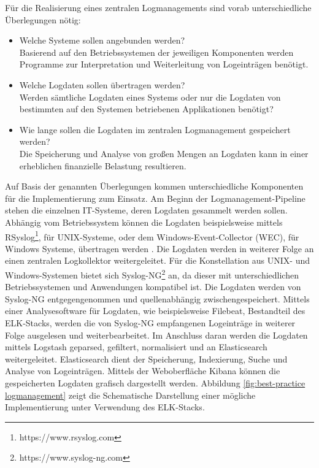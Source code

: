 Für die Realisierung eines zentralen Logmanagements sind vorab unterschiedliche Überlegungen nötig: 
\begin{itemize}
    \item Welche Systeme sollen angebunden werden?\\
    Basierend auf den Betriebssystemen der jeweiligen Komponenten werden Programme zur Interpretation und Weiterleitung von Logeinträgen benötigt. 
    \item Welche Logdaten sollen übertragen werden?\\
    Werden sämtliche Logdaten eines Systems oder nur die Logdaten von bestimmten auf den Systemen betriebenen Applikationen benötigt?
    \item Wie lange sollen die Logdaten im zentralen Logmanagement gespeichert werden?\\
    Die Speicherung und Analyse von großen Mengen an Logdaten kann in einer erheblichen finanzielle Belastung resultieren.
\end{itemize}
\bigbreak
Auf Basis der genannten Überlegungen kommen unterschiedliche Komponenten für die Implementierung zum Einsatz. Am Beginn der Logmanagement-Pipeline stehen die einzelnen IT-Systeme, deren Logdaten gesammelt werden sollen. Abhängig vom Betriebssystem können die Logdaten beispielsweise mittels RSyslog\footnote{https://www.rsyslog.com}, für UNIX-Systeme, oder dem \glqq{}Windows-Event-Collector\grqq{} (WEC), für Windows Systeme, übertragen werden \autocite{WEC}. Die Logdaten werden in weiterer Folge an einen zentralen Logkollektor weitergeleitet. Für die Konstellation aus UNIX- und Windows-Systemen bietet sich Syslog-NG\footnote{https://www.syslog-ng.com} an, da dieser mit unterschiedlichen Betriebssystemen und Anwendungen kompatibel ist. Die Logdaten werden von Syslog-NG entgegengenommen und quellenabhängig zwischengespeichert. Mittels einer Analysesoftware für Logdaten, wie beispielsweise \glqq{}Filebeat\grqq{}, Bestandteil des ELK-Stacks, werden die von Syslog-NG empfangenen Logeinträge in weiterer Folge ausgelesen und weiterbearbeitet. Im Anschluss daran werden die Logdaten mittels Logstash geparsed, gefiltert, normalisiert und an Elasticsearch weitergeleitet. Elasticsearch dient der Speicherung, Indexierung, Suche und Analyse von Logeinträgen. Mittels der Weboberfläche Kibana können die gespeicherten Logdaten grafisch dargestellt werden. Abbildung \ref{fig:best-practice logmanagement} zeigt die Schematische Darstellung einer mögliche Implementierung unter Verwendung des ELK-Stacks. 

